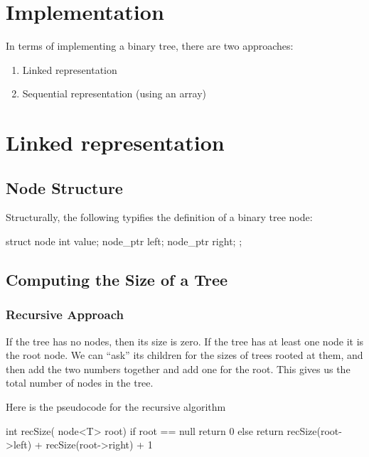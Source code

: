 \documentclass{report}
\begin{document}
\section{Implementation}
In terms of implementing a binary tree, there are two approaches:
\begin{enumerate}
  \item Linked representation 
  \item Sequential representation (using an array)
\end{enumerate}
\section{Linked representation}
\subsection{Node Structure}
Structurally, the following typifies the definition of a binary tree node:
\begin{cppcode}
struct node {
  int value;
  node_ptr left;
  node_ptr right;
};
\end{cppcode}
\subsection{Computing the Size of a Tree}
\subsubsection*{Recursive Approach}
If the tree has no nodes, then its size is zero. If the tree has at least one node it is the root node. We can ``ask'' its children for the sizes of trees rooted at them, and then add the two numbers together and add one for the root. This gives us the total number of nodes in the tree. \vspace{2mm}

\noindent Here is the pseudocode for the recursive algorithm
\begin{cppcode}
  int recSize( node<T> root) {
    if root == null
      return 0
    else
      return recSize(root->left) + recSize(root->right) + 1
  }
\end{cppcode}
\end{document}
